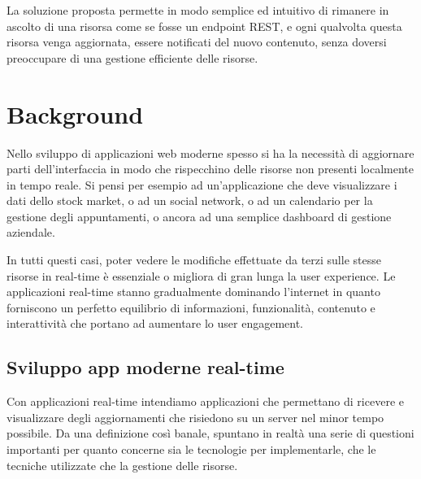 \documentclass[12pt,a4paper,openright,twoside]{report}
\begin{document}
\bigskip

La soluzione proposta permette in modo semplice ed intuitivo di rimanere in ascolto di una risorsa come se fosse un endpoint REST, e ogni qualvolta questa risorsa venga aggiornata, essere notificati del nuovo contenuto, senza doversi preoccupare di una gestione efficiente delle risorse.

\chapter{Background}
\pagestyle{fancy}
\lhead[\rmfamily\thepage]{\fancyplain{}{\itshape\nouppercase\rightmark}} %
\rhead[\fancyplain{}{\itshape\nouppercase\leftmark}]{\rmfamily\thepage} %

Nello sviluppo di applicazioni web moderne spesso si ha la necessità di aggiornare parti dell’interfaccia in modo che rispecchino delle risorse non presenti localmente in tempo reale. Si pensi per esempio ad un’applicazione che deve visualizzare i dati dello stock market, o ad un social network, o ad un calendario per la gestione degli appuntamenti, o ancora ad una semplice dashboard di gestione aziendale. 

\bigskip

In tutti questi casi, poter vedere le modifiche effettuate da terzi sulle stesse risorse in real-time è essenziale o migliora di gran lunga la user experience. Le applicazioni real-time stanno gradualmente dominando l’internet in quanto forniscono un perfetto equilibrio di informazioni, funzionalità, contenuto e interattività che portano ad aumentare lo user engagement.

\section{Sviluppo app moderne real-time}\label{sec_appmoderne}

Con applicazioni real-time intendiamo applicazioni che permettano di ricevere e visualizzare degli aggiornamenti che risiedono su un server nel minor tempo possibile. Da una definizione così banale, spuntano in realtà una serie di questioni importanti per quanto concerne sia le tecnologie per implementarle, che le tecniche utilizzate che la gestione delle risorse.
\end{document}
